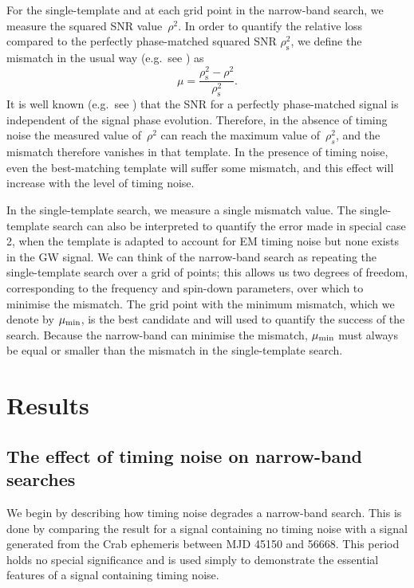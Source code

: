 \documentclass[../full_thesis/full_thesis.tex]{subfiles}
\begin{document}
For the single-template and at each grid point in the narrow-band search, we
measure the squared SNR value~$\rho^{2}$.  In order to quantify the relative
loss compared to the perfectly phase-matched squared SNR
$\rho^{2}_{\mathrm{s}}$, we define the mismatch in the usual way (e.g.\ see
\citet{Prix2007}) as
\begin{equation}
    \mu = \frac{{\rho^{2}_{\mathrm{s}} -
                                  \rho^{2}}}{\rho^{2}_{\mathrm{s}}}.
\label{eqn:mismatch}
\end{equation}
It is well known (e.g.\ see \citet{Prix2009}) that the SNR for a
perfectly phase-matched signal is independent of the signal phase
evolution. Therefore, in the absence of timing
noise the measured value of~$\rho^{2}$ can reach the maximum value
of~$\rho^{2}_{s}$, and the mismatch therefore vanishes in that template.
In the presence of timing noise, even the best-matching template will
suffer some mismatch, and this effect will increase with the level of
timing noise.

In the single-template search, we measure a single mismatch value.  The
single-template search can also be interpreted to quantify the error made in
special case 2, when the template is adapted to account for EM timing noise but
none exists in the GW signal.  We can think of the narrow-band search as
repeating the single-template search over a grid of points; this allows us two
degrees of freedom, corresponding to the frequency and spin-down parameters,
over which to minimise the mismatch. The grid point with the minimum mismatch,
which we denote by $\mu_{\mathrm{min}}$, is the best candidate and will used to quantify
the success of the search.  Because the narrow-band can minimise the mismatch,
$\mu_{\mathrm{min}}$ must always be equal or smaller than the mismatch in the
single-template search.


\section{Results}
\label{sec: narrow-band results}
\subsection{The effect of timing noise on narrow-band searches} We begin by
describing how timing noise degrades a narrow-band search. This is done by
comparing the result for a signal containing no timing noise with a signal
generated from the Crab ephemeris between MJD 45150 and 56668. This period
holds no special significance and is used simply to demonstrate the essential
features of a signal containing timing noise.
\end{document}
